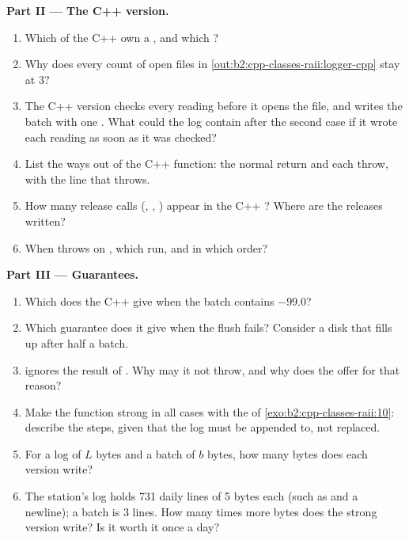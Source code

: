 \begin{problem}
\medskip\noindent\textbf{Part II --- The C++ version.}\par\nopagebreak
\begin{enumerate}[resume, beginpenalty=10000]
\item Which  of the C++  own a , and which ?
\item Why does every count of open files in \cref{out:b2:cpp-classes-raii:logger-cpp} stay at 3?
\item The C++ version checks every reading before it opens the file, and writes the batch with one .
What could the log contain after the second case if it wrote each reading as soon as it was checked?
\item List the ways out of the C++ function: the normal return and each throw, with the line that throws.
\item How many release calls (, , ) appear in the C++ ?
Where are the releases written?
\item When  throws on , which  run, and in which order?
\end{enumerate}

\medskip\noindent\textbf{Part III --- Guarantees.}\par\nopagebreak
\begin{enumerate}[resume, beginpenalty=10000]
\item Which  does the C++  give when the batch contains $-99.0$?
\item Which guarantee does it give when the flush fails? Consider a disk that fills up after half a batch.
\item {} ignores the result of . Why may it not throw, and why does the  offer
 for that reason?
\item Make the function strong in all cases with the  of \cref{exo:b2:cpp-classes-raii:10}: describe
the steps, given that the log must be appended to, not replaced.
\item For a log of $L$ bytes and a batch of $b$ bytes, how many bytes does each version write?
\item The station's log holds 731 daily lines of 5 bytes each (such as  and a newline); a batch is 3
lines. How many times more bytes does the strong version write? Is it worth it once a day?
\end{enumerate}


\end{problem}
